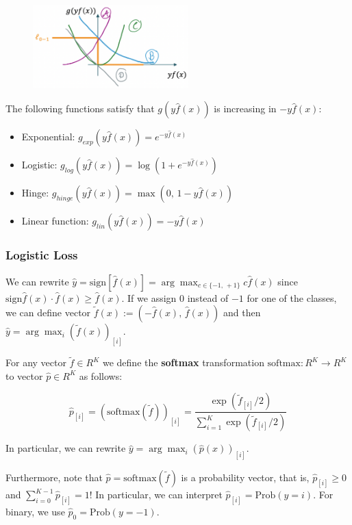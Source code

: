 \documentclass[a4paper]{extarticle}
\begin{document}
\begin{figure}[H]
    \includegraphics[width=6cm]{../images/IntroML_Fig4-4}
    \centering
\end{figure}

The following functions satisfy that \(g(y\hat{f}(x))\) is increasing in \(-y\hat{f}(x)\):

\begin{itemize}
    \item Exponential: \(g_{exp}(y \hat{f}(x)) = e^{-y \hat{f}(x)}\)
    \item Logistic: \(g_{log}(y \hat{f}(x)) = \log (1 + e^{-y \hat{f}(x)})\)
    \item Hinge: \(g_{hinge}(y \hat{f}(x)) = \max (0, \, 1 - y \hat{f}(x))\)
    \item Linear function: \(g_{lin}(y \hat{f}(x)) = -y\hat{f}(x)\)
\end{itemize}

\subsubsection{Logistic Loss}

We can rewrite \(\hat{y} = \text{sign}[\hat{f}(x)] = \arg \max_{c \in \{-1, \, +1\}} c\hat{f}(x)\) since \(\text{sign} \hat{f}(x) \cdot \hat{f}(x) \geq \hat{f}(x)\). If we assign \(0\) instead of \(-1\) for one of the classes, we can define vector \(\tilde{f}(x) := (- \hat{f}(x), \, \hat{f}(x))\) and then \(\hat{y} = \arg \max_i (\tilde{f}(x))_{[i]}\).

For any vector \(\tilde{f} \in R^K\) we define the \textbf{softmax} transformation \(\text{softmax} : R^K \to R^K\) to vector \(\hat{p} \in R^K\) as follows:

\[
    \hat{p}_{[i]} = (\text{softmax} (\tilde{f}))_{[i]} = \frac{\exp(\tilde{f}_{[i]}/2)}{\sum_{i = 1}^{K} \exp(\tilde{f}_{[i]}/2)}
\]

In particular, we can rewrite \(\hat{y} = \arg \max_i (\hat{p}(x))_{[i]}\).

Furthermore, note that \(\hat{p} = \text{softmax}(\tilde{f})\) is a probability vector, that is, \(\hat{p}_{[i]} \geq 0\) and \(\sum_{i = 0}^{K - 1} \hat{p}_[i] = 1\)! In particular, we can interpret \(\hat{p}_{[i]} = \text{Prob}(y = i)\). For binary, we use \(\hat{p}_0 = \text{Prob}(y = -1)\).
\end{document}
